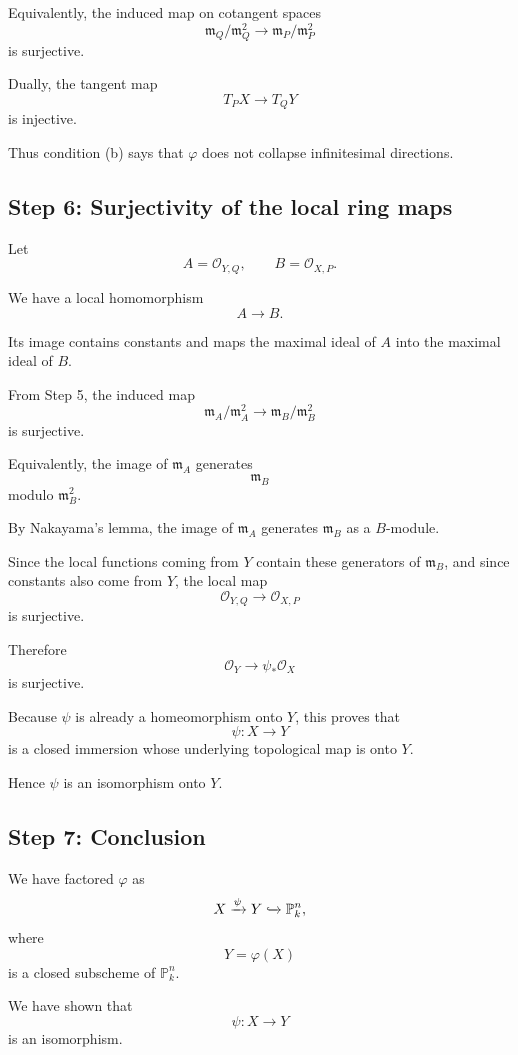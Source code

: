 \documentclass[12pt,a4paper]{article}
\theoremstyle{notespace}
\begin{document}
Equivalently, the induced map on cotangent spaces
\[
\mathfrak m_Q/\mathfrak m_Q^2
\longrightarrow
\mathfrak m_P/\mathfrak m_P^2
\]
is surjective.

Dually, the tangent map
\[
T_PX\longrightarrow T_QY
\]
is injective.

Thus condition (b) says that $\varphi$ does not collapse infinitesimal
directions.

\subsection*{Step 6: Surjectivity of the local ring maps}

Let
\[
A=\mathcal O_{Y,Q},
\qquad
B=\mathcal O_{X,P}.
\]

We have a local homomorphism
\[
A\longrightarrow B.
\]

Its image contains constants and maps the maximal ideal of $A$ into the
maximal ideal of $B$.

From Step 5, the induced map
\[
\mathfrak m_A/\mathfrak m_A^2
\longrightarrow
\mathfrak m_B/\mathfrak m_B^2
\]
is surjective.

Equivalently, the image of $\mathfrak m_A$ generates
\[
\mathfrak m_B
\]
modulo $\mathfrak m_B^2$.

By Nakayama's lemma, the image of $\mathfrak m_A$ generates $\mathfrak m_B$
as a $B$-module.

Since the local functions coming from $Y$ contain these generators of
$\mathfrak m_B$, and since constants also come from $Y$, the local map
\[
\mathcal O_{Y,Q}\longrightarrow \mathcal O_{X,P}
\]
is surjective.

Therefore
\[
\mathcal O_Y\longrightarrow \psi_*\mathcal O_X
\]
is surjective.

Because $\psi$ is already a homeomorphism onto $Y$, this proves that
\[
\psi:X\to Y
\]
is a closed immersion whose underlying topological map is onto $Y$.

Hence $\psi$ is an isomorphism onto $Y$.

\subsection*{Step 7: Conclusion}

We have factored $\varphi$ as
\[
X\xrightarrow{\psi}Y\xhookrightarrow{} \mathbb P_k^n,
\]
where
\[
Y=\varphi(X)
\]
is a closed subscheme of $\mathbb P_k^n$.

We have shown that
\[
\psi:X\to Y
\]
is an isomorphism.
\end{document}
